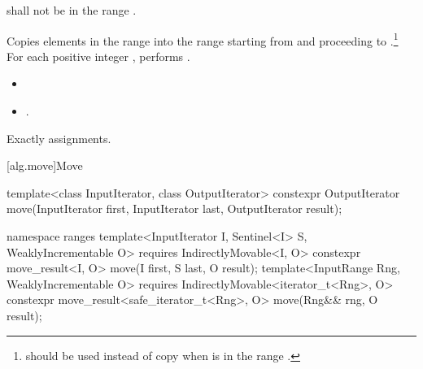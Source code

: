 \begin{itemdescr}
\pnum
\requires
{}
shall not be in the range
.

\pnum
\effects
Copies elements in the range 
into the
range 
starting from
and proceeding to .\footnote{
should be used instead of copy when 
is in
the range
.}
For each positive integer
,
performs
.

\pnum
\returns
\begin{itemize}
\item {}
\item {}.
\end{itemize}

\pnum
\complexity
Exactly
assignments.
\end{itemdescr}

[alg.move]{Move}

%
\begin{itemdecl}
template<class InputIterator, class OutputIterator>
  constexpr OutputIterator move(InputIterator first, InputIterator last,
                                OutputIterator result);
\end{itemdecl}
\begin{addedblock}
%
\begin{itemdecl}
namespace ranges {
  template<InputIterator I, Sentinel<I> S, WeaklyIncrementable O>
    requires IndirectlyMovable<I, O>
    constexpr move_result<I, O>
      move(I first, S last, O result);
  template<InputRange Rng, WeaklyIncrementable O>
    requires IndirectlyMovable<iterator_t<Rng>, O>
    constexpr move_result<safe_iterator_t<Rng>, O>
      move(Rng&& rng, O result);
}
\end{itemdecl}
\end{addedblock}

